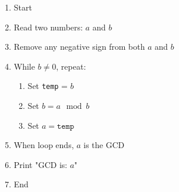 \begin{enumerate}
    \item Start
    \item Read two numbers: $a$ and $b$
    \item Remove any negative sign from both $a$ and $b$
    \item While $b \ne 0$, repeat:
    \begin{enumerate}
        \item Set \texttt{temp} = $b$
        \item Set $b = a \mod b$
        \item Set $a = \texttt{temp}$
    \end{enumerate}
    \item When loop ends, $a$ is the GCD
    \item Print "GCD is: $a$"
    \item End
\end{enumerate}

